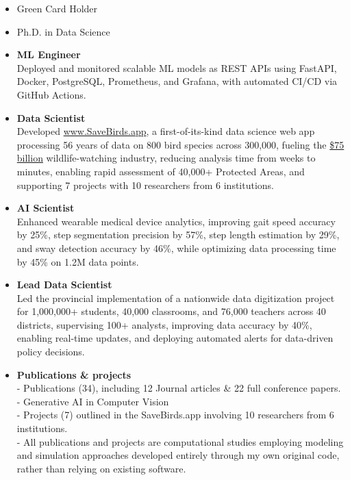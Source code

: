 \documentclass[a4paper,10pt]{article}
\begin{document}
\begin{itemize}

    \item Green Card Holder
    
    \item Ph.D. in Data Science
    
    \item \textbf{ML Engineer} \\     
    Deployed and monitored scalable ML models as REST APIs using FastAPI, Docker, PostgreSQL, Prometheus, and Grafana, with automated CI/CD via GitHub Actions.
    
    \item \textbf{Data Scientist} \\ 
    Developed \href{http://savebirds.app/}{www.SaveBirds.app}, a first-of-its-kind data science web app processing 56 years of data on 800 bird species across 300,000, fueling the \href{https://www.usgs.gov/centers/eesc/science/north-american-breeding-bird-survey#:%7E:text=common%20and%20helping-,fuel%20a%20%2475%20billion%20wildlife%20watching%20industry,-.%C2%A0%C2%A0Each%20year%20thousands:~:text=helping%20fuel%20a%20%2475%20billion%20wildlife%20watching%20industry}{\$75 billion} wildlife-watching industry, reducing analysis time from weeks to minutes, enabling rapid assessment of 40,000+ Protected Areas, and supporting 7 projects with 10 researchers from 6 institutions.  
    
    \item \textbf{AI Scientist} \\
    Enhanced wearable medical device analytics, improving gait speed accuracy by 25\%, step segmentation precision by 57\%, step length estimation by 29\%, and sway detection accuracy by 46\%, while optimizing data processing time by 45\% on 1.2M data points. 
    
    \item \textbf{Lead Data Scientist} \\
    Led the provincial implementation of a nationwide data digitization project for 1,000,000+ students, 40,000 classrooms, and 76,000 teachers across 40 districts, supervising 100+ analysts, improving data accuracy by 40\%, enabling real-time updates, and deploying automated alerts for data-driven policy decisions.

    \item \textbf{Publications \& projects } \\
    - Publications (34), including 12 Journal articles \& 22 full conference papers. \\    
    - Generative AI in Computer Vision \\    
    - Projects (7) outlined in the SaveBirds.app involving 10 researchers from 6 institutions. \\     
    - All publications and projects are computational studies employing modeling and simulation approaches developed entirely through my own original code, rather than relying on existing software.     
 

\end{itemize}
\end{document}
